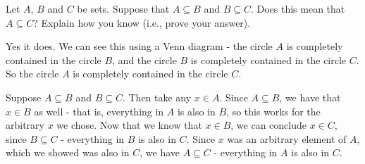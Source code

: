 \documentclass[11pt]{exam}
\def\circleA{(-.5,0) circle (1)}
\def\circleB{(.5,0) circle (1)}
\def\circleC{(0,-1) circle (1)}
\def\threesetbox{(-2,-2.5) rectangle (2,1.5)}
\begin{document}
\begin{questions}

\question[6] Let $A$, $B$ and $C$ be sets.  Suppose that $A \subseteq B$ and $B \subseteq C$.  Does this mean that $A \subseteq C$?  Explain how you know (i.e., prove your answer).

\begin{solution}
 Yes it does.  We can see this using a Venn diagram - the circle $A$ is completely contained in the circle $B$, and the circle $B$ is completely contained in the circle $C$.  So the circle $A$ is completely contained in the circle $C$.  
 
 Suppose $A \subseteq B$ and $B \subseteq C$.  Then take any $x \in A$.  Since $A \subseteq B$, we have that $x \in B$ as well - that is, everything in $A$ is also in $B$, so this works for the arbitrary $x$ we chose.  Now that we know that $x \in B$, we can conclude $x \in C$, since $B \subseteq C$ - everything in $B$ is also in $C$.  Since $x$ was an arbitrary element of $A$, which we showed was also in $C$, we have $A \subseteq C$ - everything in $A$ is also in $C$.
\end{solution}


\question[6] 
\end{questions}
\end{document}
